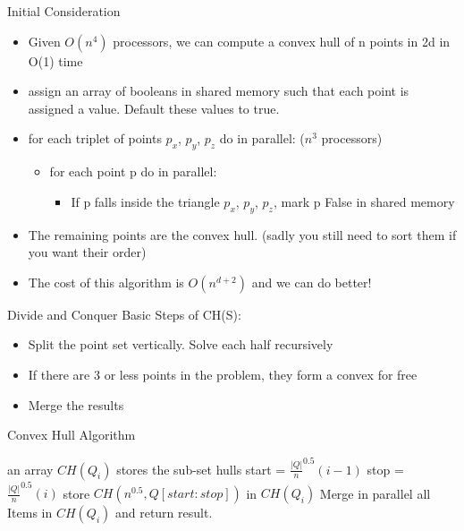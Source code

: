 \documentclass{beamer}
\begin{document}
\begin{frame}{Initial Consideration}

\begin{itemize}
\item
	Given $O(n^4)$ processors, we can compute a convex hull of n points in 2d in O(1) time
\item
	assign an array of booleans in shared memory such that each point is assigned a value. Default these values to true.
\item
	for each triplet of points $p_x$, $p_y$, $p_z$ do in parallel: ($n^3$ processors)
	\begin{itemize}
		\item
			for each point p do in parallel:
		\begin{itemize}
			\item
				If p falls inside the triangle $p_x$, $p_y$, $p_z$, mark p False in shared memory
		\end{itemize}	
	\end{itemize}	
	
\item
	The remaining points are the convex hull. (sadly you still need to sort them if you want their order)
\item
	The cost of this algorithm is $O(n^{d+2})$ and we can do better!

\end{itemize}
\end{frame}

\begin{frame}{Divide and Conquer}
Basic Steps of CH(S):
\begin{itemize}
\item
	Split the point set vertically. Solve each half recursively
\item
	If there are 3 or less points in the problem, they form a convex for free
\item
	Merge the results
\end{itemize}
\end{frame}


\begin{frame}{Convex Hull Algorithm}
\begin{algorithm}[H]
    \begin{algorithmic}
            \EndIf
            \State an array $CH(Q_i)$ stores the sub-set hulls
            		\State start = $\frac{|Q|}n^{0.5}(i-1)$
           		\State stop = $\frac{|Q|}n^{0.5}(i)$
            		\State store $CH(n^{0.5}, Q[start:stop])$ in $CH(Q_i)$
            \EndFor
            \State Merge in parallel all Items in $CH(Q_i)$ and return result.
                
        \EndFunction
    \end{algorithmic}
\label{alg:seq2}
\end{algorithm}
\end{frame}
\end{document}
